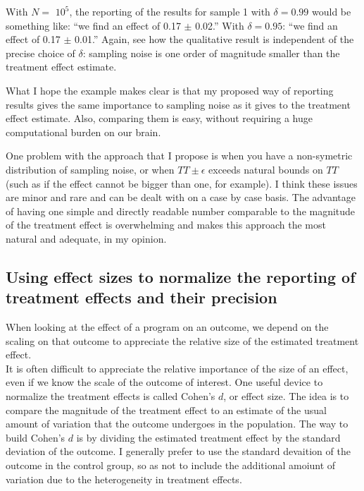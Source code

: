 \documentclass[]{book}
\theoremstyle{definition}
\theoremstyle{definition}
\theoremstyle{definition}
\theoremstyle{remark}
\let\BeginKnitrBlock\begin \let\EndKnitrBlock\end
\begin{document}
With \(N=\) \ensuremath{10^{5}}, the reporting of the results for sample 1 with \(\delta=0.99\) would be something like: ``we find an effect of 0.17 \(\pm\) 0.02.''
With \(\delta=0.95\): ``we find an effect of 0.17 \(\pm\) 0.01.''
Again, see how the qualitative result is independent of the precise choice of \(\delta\): sampling noise is one order of magnitude smaller than the treatment effect estimate.

\BeginKnitrBlock{remark}
\iffalse{} {Remark. } \fi{}What I hope the example makes clear is that my proposed way of reporting results gives the same importance to sampling noise as it gives to the treatment effect estimate.
Also, comparing them is easy, without requiring a huge computational burden on our brain.
\EndKnitrBlock{remark}

\BeginKnitrBlock{remark}
\iffalse{} {Remark. } \fi{}One problem with the approach that I propose is when you have a non-symetric distribution of sampling noise, or when \(TT \pm \epsilon\) exceeds natural bounds on \(TT\) (such as if the effect cannot be bigger than one, for example).
I think these issues are minor and rare and can be dealt with on a case by case basis.
The advantage of having one simple and directly readable number comparable to the magnitude of the treatment effect is overwhelming and makes this approach the most natural and adequate, in my opinion.
\EndKnitrBlock{remark}

\hypertarget{sec:effectsize}{%
\subsection{Using effect sizes to normalize the reporting of treatment effects and their precision}\label{sec:effectsize}}

When looking at the effect of a program on an outcome, we depend on the scaling on that outcome to appreciate the relative size of the estimated treatment effect.\\
It is often difficult to appreciate the relative importance of the size of an effect, even if we know the scale of the outcome of interest.
One useful device to normalize the treatment effects is called Cohen's \(d\), or effect size.
The idea is to compare the magnitude of the treatment effect to an estimate of the usual amount of variation that the outcome undergoes in the population.
The way to build Cohen's \(d\) is by dividing the estimated treatment effect by the standard deviation of the outcome.
I generally prefer to use the standard devaition of the outcome in the control group, so as not to include the additional amoiunt of variation due to the heterogeneity in treatment effects.
\end{document}
